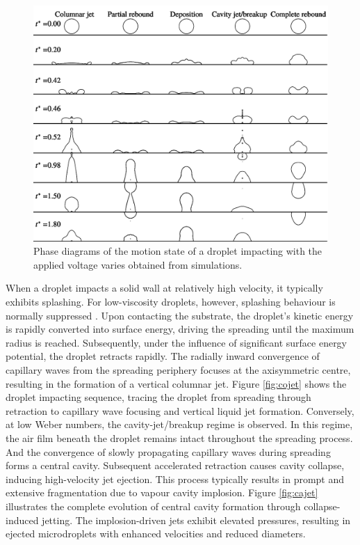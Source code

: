 \documentclass[lineno]{cls/jfm}
\begin{document}
 \begin{figure}
  \centerline{\includegraphics[width=1.0\textwidth]{fig/dropA.pdf}}
  \caption{Phase diagrams of the motion state of a droplet impacting with the applied voltage varies obtained from simulations.}
 \label{fig:dropA}
 \end{figure}
 
 When a droplet impacts a solid wall at relatively high velocity, it typically exhibits splashing. For low-viscosity droplets, however, splashing behaviour is normally suppressed \citep{jian_two_2018}. Upon contacting the substrate, the droplet's kinetic energy is rapidly converted into surface energy, driving the spreading until the maximum radius is reached. Subsequently, under the influence of significant surface energy potential, the droplet retracts rapidly. The radially inward convergence of capillary waves from the spreading periphery focuses at the axisymmetric centre, resulting in the formation of a vertical columnar jet. Figure \ref{fig:cojet} shows the droplet impacting sequence, tracing the droplet from spreading through retraction to capillary wave focusing and vertical liquid jet formation. Conversely, at low Weber numbers, the cavity-jet/breakup regime is observed. In this regime, the air film beneath the droplet remains intact throughout the spreading process. And the convergence of slowly propagating capillary waves during spreading forms a central cavity. Subsequent accelerated retraction causes cavity collapse, inducing high-velocity jet ejection. This process typically results in prompt and extensive fragmentation due to vapour cavity implosion. Figure \ref{fig:cajet} illustrates the complete evolution of central cavity formation through collapse-induced jetting. The implosion-driven jets exhibit elevated pressures, resulting in ejected microdroplets with enhanced velocities and reduced diameters.
\end{document}
